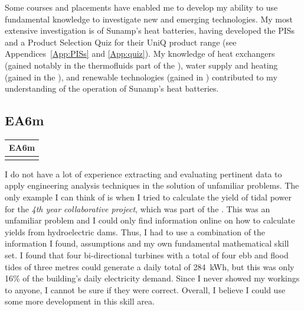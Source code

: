 Some courses and placements have enabled me to develop my ability to use fundamental knowledge to investigate new and emerging technologies.
My most extensive investigation is of Sunamp's heat batteries, having developed the PISs and a Product Selection Quiz for their UniQ product range (see Appendices~\ref{App:PISs} and \ref{App:quiz}).
My knowledge of heat exchangers (gained notably in the thermofluids part of the \LABTitle),
water supply and heating (gained in the \PRJTitle),
and renewable technologies (gained in \EnBldgsTitle)
contributed to my understanding of the operation of Sunamp's heat batteries.










\subsection*{EA6m} \label{sec:EA6m}

\begin{table}
	\begin{tabular}{|ll|}
		\hline
		\multicolumn{2}{|c|}{\cellcolor[HTML]{F8A102}\textbf{EA6m \littlemaster}} \\ \hline
		\multicolumn{2}{|c|}{\PRJ} \\ \hline
	\end{tabular}
\end{table}

I do not have a lot of experience extracting and evaluating pertinent data to apply engineering analysis techniques in the solution of unfamiliar problems.
The only example I can think of is when I tried to calculate the yield of tidal power for the \textit{4th year collaborative project}, which was part of the \PRJTitle.
This was an unfamiliar problem and I could only find information online on how to calculate yields from hydroelectric dams.
Thus, I had to use a combination of the information I found, assumptions and my own fundamental mathematical skill set.
I found that four bi-directional turbines with a total of four ebb and flood tides of three metres could generate a daily total of 284~kWh, but this was only 16\% of the building's daily electricity demand.
Since I never showed my workings to anyone, I cannot be sure if they were correct.
Overall, I believe I could use some more development in this skill area.
